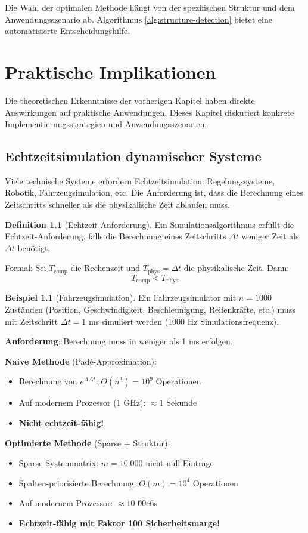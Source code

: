 \documentclass[a4paper,12pt]{report}
\theoremstyle{definition}
\newtheorem{definition}{Definition}
\newtheorem{beispiel}{Beispiel}
\begin{document}
	Die Wahl der optimalen Methode hängt von der spezifischen Struktur und dem Anwendungsszenario ab. Algorithmus \ref{alg:structure-detection} bietet eine automatisierte Entscheidungshilfe.
	
	\chapter{Praktische Implikationen}
	
	Die theoretischen Erkenntnisse der vorherigen Kapitel haben direkte Auswirkungen auf praktische Anwendungen. Dieses Kapitel diskutiert konkrete Implementierungsstrategien und Anwendungsszenarien.
	
	\section{Echtzeitsimulation dynamischer Systeme}
	
	Viele technische Systeme erfordern Echtzeitsimulation: Regelungssysteme, Robotik, Fahrzeugsimulation, etc. Die Anforderung ist, dass die Berechnung eines Zeitschritts schneller als die physikalische Zeit ablaufen muss.
	
	\begin{definition}[Echtzeit-Anforderung]
		Ein Simulationsalgorithmus erfüllt die Echtzeit-Anforderung, falls die Berechnung eines Zeitschritts $\Delta t$ weniger Zeit als $\Delta t$ benötigt.
		
		Formal: Sei $T_{\text{comp}}$ die Rechenzeit und $T_{\text{phys}} = \Delta t$ die physikalische Zeit. Dann:
		\[
		T_{\text{comp}} < T_{\text{phys}}
		\]
	\end{definition}
	
	\begin{beispiel}[Fahrzeugsimulation]
		Ein Fahrzeugsimulator mit $n = 1000$ Zuständen (Position, Geschwindigkeit, Beschleunigung, Reifenkräfte, etc.) muss mit Zeitschritt $\Delta t = 1$ ms simuliert werden (1000 Hz Simulationsfrequenz).
		
		\textbf{Anforderung}: Berechnung muss in weniger als 1 ms erfolgen.
		
		\textbf{Naive Methode} (Padé-Approximation):
		\begin{itemize}
			\item Berechnung von $e^{A \Delta t}$: $O(n^3) = 10^9$ Operationen
			\item Auf modernem Prozessor (1 GHz): $\approx 1$ Sekunde
			\item \textbf{Nicht echtzeit-fähig!}
		\end{itemize}
		
		\textbf{Optimierte Methode} (Sparse + Struktur):
		\begin{itemize}
			\item Sparse Systemmatrix: $m = 10.000$ nicht-null Einträge
			\item Spalten-priorisierte Berechnung: $O(m) = 10^4$ Operationen
			\item Auf modernem Prozessor: $\approx 10$ \u00e6s
			\item \textbf{Echtzeit-fähig mit Faktor 100 Sicherheitsmarge!}
		\end{itemize}
	\end{beispiel}
	
\end{document}
